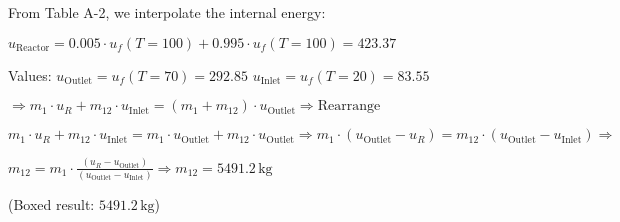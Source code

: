 From Table A-2, we interpolate the internal energy:  

\( u_{\text{Reactor}} = 0.005 \cdot u_f(T = 100) + 0.995 \cdot u_f(T = 100) = 423.37 \)  

Values:  
\( u_{\text{Outlet}} = u_f(T = 70) = 292.85 \)  
\( u_{\text{Inlet}} = u_f(T = 20) = 83.55 \)  

\(\Rightarrow m_1 \cdot u_R + m_{12} \cdot u_{\text{Inlet}} = (m_1 + m_{12}) \cdot u_{\text{Outlet}} \Rightarrow \text{Rearrange}\)  

\( m_1 \cdot u_R + m_{12} \cdot u_{\text{Inlet}} = m_1 \cdot u_{\text{Outlet}} + m_{12} \cdot u_{\text{Outlet}} \Rightarrow m_1 \cdot (u_{\text{Outlet}} - u_R) = m_{12} \cdot (u_{\text{Outlet}} - u_{\text{Inlet}}) \Rightarrow \)  

\( m_{12} = m_1 \cdot \frac{(u_R - u_{\text{Outlet}})}{(u_{\text{Outlet}} - u_{\text{Inlet}})} \Rightarrow m_{12} = 5491.2 \, \text{kg} \)  

(Boxed result: \( 5491.2 \, \text{kg} \))